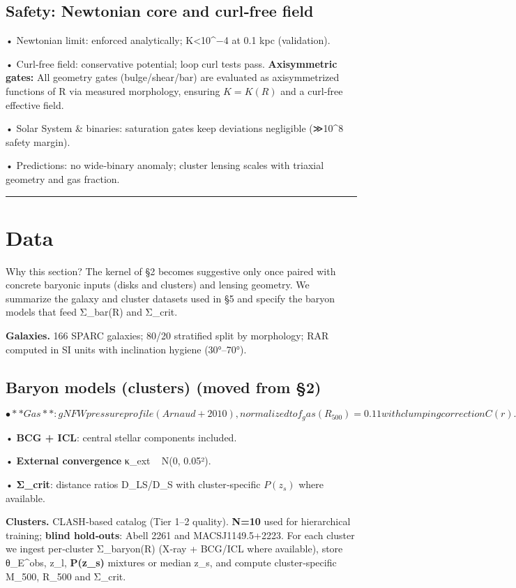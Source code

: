 \documentclass[11pt,a4paper]{article}
\begin{document}
\subsection{Safety: Newtonian core and curl‑free field}


• Newtonian limit: enforced analytically; K<10^−4 at 0.1 kpc (validation).  

• Curl‑free field: conservative potential; loop curl tests pass. \textbf{Axisymmetric gates:} All geometry gates (bulge/shear/bar) are evaluated as axisymmetrized functions of R via measured morphology, ensuring $K=K(R)$ and a curl‑free effective field.  

• Solar System \& binaries: saturation gates keep deviations negligible (≫10^8 safety margin).  

• Predictions: no wide‑binary anomaly; cluster lensing scales with triaxial geometry and gas fraction.



\medskip\hrule\medskip


\section{Data}


Why this section? The kernel of §2 becomes suggestive only once paired with concrete baryonic inputs (disks and clusters) and lensing geometry. We summarize the galaxy and cluster datasets used in §5 and specify the baryon models that feed Σ\_bar(R) and Σ\_crit.


\textbf{Galaxies.} 166 SPARC galaxies; 80/20 stratified split by morphology; RAR computed in SI units with inclination hygiene (30°–70°).


\subsection{Baryon models (clusters) (moved from §2)}


\[
• **Gas**: gNFW pressure profile (Arnaud+2010), normalized to f_gas(R_500)=0.11 with clumping correction C(r).
\]

• \textbf{BCG + ICL}: central stellar components included.  

• \textbf{External convergence} κ\_ext ~ N(0, 0.05²).  

• \textbf{Σ\_crit}: distance ratios D\_LS/D\_S with cluster‑specific $P(z_s)$ where available.


\textbf{Clusters.} CLASH‑based catalog (Tier 1–2 quality). \textbf{N=10} used for hierarchical training; \textbf{blind hold‑outs}: Abell 2261 and MACSJ1149.5+2223. For each cluster we ingest per‑cluster Σ\_baryon(R) (X‑ray + BCG/ICL where available), store {θ\_E^obs, z\_l, \textbf{P(z\_s)} mixtures or median z\_s}, and compute cluster‑specific M\_500, R\_500 and Σ\_crit.
\end{document}

